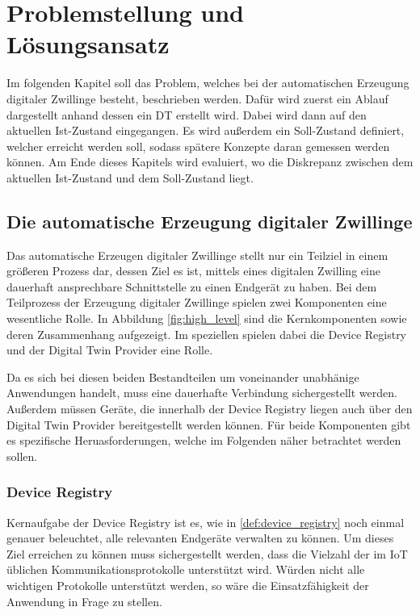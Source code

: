 \chapter{Problemstellung und Lösungsansatz}

Im folgenden Kapitel soll das Problem, welches bei der automatischen Erzeugung digitaler Zwillinge besteht, beschrieben werden. Dafür wird zuerst ein Ablauf dargestellt anhand dessen ein \ac{DT} erstellt wird. Dabei wird dann auf den aktuellen Ist-Zustand eingegangen. Es wird außerdem ein Soll-Zustand definiert, welcher erreicht werden soll, sodass spätere Konzepte daran gemessen werden können. Am Ende dieses Kapitels wird evaluiert, wo die Diskrepanz zwischen dem aktuellen Ist-Zustand und dem Soll-Zustand liegt.

\section{Die automatische Erzeugung digitaler Zwillinge}

Das automatische Erzeugen digitaler Zwillinge stellt nur ein Teilziel in einem größeren Prozess dar, dessen Ziel es ist, mittels eines digitalen Zwilling eine dauerhaft ansprechbare Schnittstelle zu einen Endgerät zu haben. Bei dem Teilprozess der Erzeugung digitaler Zwillinge spielen zwei Komponenten eine wesentliche Rolle. In Abbildung \vref{fig:high_level} sind die Kernkomponenten sowie deren Zusammenhang aufgezeigt. Im speziellen spielen dabei die Device Registry und der Digital Twin Provider eine Rolle.

Da es sich bei diesen beiden Bestandteilen um voneinander unabhänige Anwendungen handelt, muss eine dauerhafte Verbindung sichergestellt werden. Außerdem müssen Geräte, die innerhalb der Device Registry liegen auch über den Digital Twin Provider bereitgestellt werden können. Für beide Komponenten gibt es spezifische Heruasforderungen, welche im Folgenden näher betrachtet werden sollen.

\subsection{Device Registry}

Kernaufgabe der Device Registry ist es, wie in \vref{def:device_registry} noch einmal genauer beleuchtet, alle relevanten Endgeräte verwalten zu können. Um dieses Ziel erreichen zu können muss sichergestellt werden, dass die Vielzahl der im \ac{IoT} üblichen Kommunikationsprotokolle unterstützt wird. Würden nicht alle wichtigen Protokolle unterstützt werden, so wäre die Einsatzfähigkeit der Anwendung in Frage zu stellen. 

